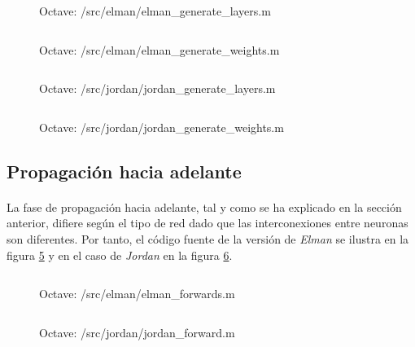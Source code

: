 \documentclass[10pt, a4paper,spanish]{article}
\begin{document}
			\begin{figure}[htpb!]
				\centering
				\inputminted{octave}{../src/elman/elman_generate_layers.m}
				\caption{Octave: /src/elman/elman\_generate\_layers.m}
				\label{code:jordan_generate_layers}
			\end{figure}

			\begin{figure}[htpb!]
				\centering
				\inputminted{octave}{../src/elman/elman_generate_weights.m}
				\caption{Octave: /src/elman/elman\_generate\_weights.m}
				\label{code:elman_generate_weights}
			\end{figure}

			\begin{figure}[htpb!]
				\centering
				\inputminted{octave}{../src/jordan/jordan_generate_layers.m}
				\caption{Octave: /src/jordan/jordan\_generate\_layers.m}
				\label{code:jordan_generate_layers}
			\end{figure}

			\begin{figure}[htpb!]
				\centering
				\inputminted{octave}{../src/jordan/jordan_generate_weights.m}
				\caption{Octave: /src/jordan/jordan\_generate\_weights.m}
				\label{code:jordan_generate_weights}
			\end{figure}


		\subsection{Propagación hacia adelante}
			\paragraph{}
			La fase de propagación hacia adelante, tal y como se ha explicado en la sección anterior, difiere según el tipo de red dado que las interconexiones entre neuronas son diferentes. Por tanto, el código fuente de la versión de \emph{Elman} se ilustra en la figura \ref{code:elman_forward} y en el caso de \emph{Jordan} en la figura \ref{code:jordan_forward}.

			\begin{figure}[htpb!]
				\centering
				\inputminted{octave}{../src/elman/elman_forward.m}
				\caption{Octave: /src/elman/elman\_forwards.m}
				\label{code:elman_forward}
			\end{figure}

			\begin{figure}[htpb!]
				\centering
				\inputminted{octave}{../src/jordan/jordan_forward.m}
				\caption{Octave: /src/jordan/jordan\_forward.m}
				\label{code:jordan_forward}
			\end{figure}
\end{document}
